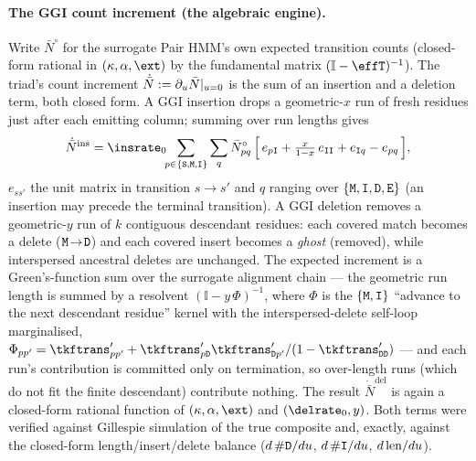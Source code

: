 \paragraph{The GGI count increment (the algebraic engine).}
Write $\bar N^{\circ}$ for the surrogate Pair HMM's own expected transition
counts (closed-form rational in $(\kappa,\alpha,\ext)$ by the fundamental
matrix $(\mathbb I-\effT)^{-1}$).  The triad's count increment
$\dot{\bar N}:=\partial_u \bar N|_{u=0}$ is the sum of an insertion and
a deletion term, both closed form.  A GGI insertion drops a geometric-$x$ run of
fresh residues just after each emitting column; summing over run lengths gives
\begin{equation}
\label{eq:ggi-ins}
\dot{\bar N}^{\mathrm{ins}}
  = \insrate_0\!\!\sum_{p\in\{\sta,\mat,\ins\}}\sum_{q}
    \bar N^{\circ}_{pq}\,
    \Big[\,e_{p\ins}+\tfrac{x}{1-x}\,e_{\ins\ins}+e_{\ins q}-e_{pq}\,\Big],
\end{equation}
$e_{ss'}$ the unit matrix in transition $s\!\to\!s'$ and $q$ ranging over
$\{\mathtt{M},\mathtt{I},\mathtt{D},\mathtt{E}\}$ (an insertion may precede the terminal transition).
A GGI deletion removes a
geometric-$y$ run of $k$ contiguous descendant residues: each covered match
becomes a delete ($\mathtt{M}\!\to\!\mathtt{D}$) and each covered insert becomes a
\emph{ghost} (removed), while interspersed ancestral deletes are unchanged.
The expected increment is a Green's-function sum over the surrogate alignment
chain --- the geometric run length is summed by a resolvent
$(\mathbb I-y\,\Phi)^{-1}$, where $\Phi$ is the $\{\mathtt{M},\mathtt{I}\}$ ``advance to the
next descendant residue'' kernel with the interspersed-delete self-loop
marginalised, $\Phi_{pp'}=\tkftrans'_{pp'}+\tkftrans'_{p\del}\tkftrans'_{\del
p'}/(1-\tkftrans'_{\del\del})$ --- and each run's contribution is committed only
on termination, so over-length runs (which do not fit the finite descendant)
contribute nothing.  The result $\dot{\bar N}^{\mathrm{del}}$ is again a
closed-form rational function of $(\kappa,\alpha,\ext)$ and $(\delrate_0,y)$.
Both terms were verified against Gillespie simulation of the true composite and,
exactly, against the closed-form length/insert/delete balance
($d\,\#\mathtt{D}/du$, $d\,\#\mathtt{I}/du$, $d\,\mathrm{len}/du$).

